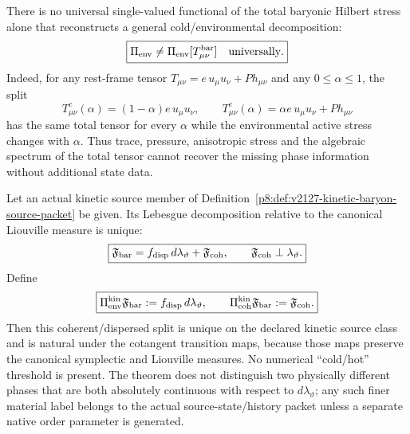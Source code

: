 \documentclass[12pt,a4paper]{article}
\begin{document}
\begin{proposition}
\label{p8:prop:v2127-stress-only-phase-no-go}
There is no universal single-valued functional of the total baryonic Hilbert
stress alone that reconstructs a general cold/environmental decomposition:
\begin{equation}
 \boxed{\Pi_{\rm env}\ne\Pi_{\rm env}[T_{\mu\nu}^{\rm bar}]\quad
 \text{universally}.}
\label{p8:eq:v2127-stress-only-no-go}
\end{equation}
Indeed, for any rest-frame tensor
$T_{\mu\nu}=e\,u_\mu u_\nu+P h_{\mu\nu}$ and any
$0\le\alpha\le1$, the split
\begin{equation}
 T^{c}_{\mu\nu}(\alpha)=(1-\alpha)e\,u_\mu u_\nu,
 \qquad
 T^{e}_{\mu\nu}(\alpha)=\alpha e\,u_\mu u_\nu+P h_{\mu\nu}
\label{p8:eq:v2127-stress-counterfamily}
\end{equation}
has the same total tensor for every $\alpha$ while the environmental active
stress changes with $\alpha$.  Thus trace, pressure, anisotropic stress and
the algebraic spectrum of the total tensor cannot recover the missing phase
information without additional state data.
\end{proposition}

\begin{theorem}
\label{p8:thm:v2127-canonical-kinetic-environment-projector}
Let an actual kinetic source member of
Definition~\ref{p8:def:v2127-kinetic-baryon-source-packet} be given.  Its
Lebesgue decomposition relative to the canonical Liouville measure is unique:
\begin{equation}
 \boxed{
 \mathfrak F_{\rm bar}
 =f_{\rm disp}\,d\lambda_\vartheta+\mathfrak F_{\rm coh},
 \qquad
 \mathfrak F_{\rm coh}\perp\lambda_\vartheta .}
\label{p8:eq:v2127-kinetic-lebesgue-split}
\end{equation}
Define
\begin{equation}
 \boxed{
 \Pi_{\rm env}^{\rm kin}\mathfrak F_{\rm bar}
 :=f_{\rm disp}\,d\lambda_\vartheta,
 \qquad
 \Pi_{\rm coh}^{\rm kin}\mathfrak F_{\rm bar}
 :=\mathfrak F_{\rm coh}.}
\label{p8:eq:v2127-kinetic-projectors}
\end{equation}
Then this coherent/dispersed split is unique on the declared kinetic source
class and is natural under the cotangent transition maps, because those maps
preserve the canonical symplectic and Liouville measures.  No numerical
``cold/hot'' threshold is present.  The theorem does not distinguish two
physically different phases that are both absolutely continuous with respect
to $d\lambda_\vartheta$; any such finer material label belongs to the actual
source-state/history packet unless a separate native order parameter is
generated.
\end{theorem}
\end{document}
